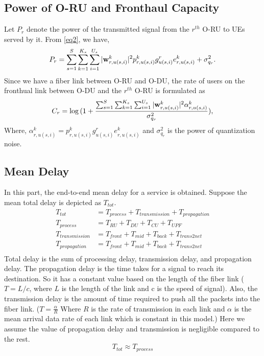 \documentclass[conference]{IEEEtran}
\begin{document}
\subsection{Power of O-RU and Fronthaul Capacity}
Let $P_r$ denote the power of the transmitted signal from the $r^{th}$ O-RU to UEs served by it. From \eqref{eq2}, we have,
\begin{equation}\label{pr}
P_r = \sum_{s=1}^{S}\sum_{k=1}^{K_s}\sum_{i=1}^{U_s}|\bold{w}_{r,u(s,i)}^{k}|^2 p_{r,u(s,i)}^{k} g_{u(s,i)}^r e^k_{r,u(s,i)}+ \sigma_{q_r}^2.
\end{equation}
Since we have a fiber link between O-RU and O-DU, the rate of users on the fronthual link between O-DU and the $r^{th}$ O-RU  is formulated as
\begin{equation}\label{cr}
C_{r} = \log{(1+ \frac{\sum_{s=1}^{S}\sum_{k=1}^{K_s}\sum_{i=1}^{U_s}|\bold{w}_{r,u(s,i)}^{k}|^2 \mathcal{\alpha}^k_{r,u(s,i)} }{ \sigma_{q_{r}}^2})},
\end{equation}
Where, $\mathcal{\alpha}^k_{r,u(s,i)}= p_{r,u(s,i)}^{k} g_{u(s,i)}^r e^k_{r,u(s,i)}$ and $\sigma_{q_{r}}^2$ is the power of quantization noise.
\subsection{Mean Delay}
In this part, the end-to-end mean delay for a service is obtained.
Suppose the mean total delay is depicted as $T_{tot}$.
\begin{equation}
\begin{split}
T_{tot} &=  T_{process} + T_{transmission} + T_{propagation}\\
T_{process} &=  T_{RU} + T_{DU} + T_{CU} + T_{UPF}\\
T_{transmission} &= T_{front} + T_{mid} + T_{back} + T_{trans2net} \\
T_{propagation} &= T_{front} + T_{mid} + T_{back} + T_{trans2net} \\
\end{split}
\end{equation}
Total delay is the sum of processing delay, transmission delay, and propagation delay. 
The propagation delay is the time takes for a signal to reach its destination. So it has a constant value based on the length of the fiber link ($T = L/c$, where $L$ is the length of the link and c is the speed of signal).
Also, the transmission delay is the amount of time required to push all the packets into the fiber link. 
($T = \frac{\alpha}{R}$ Where $R$ is the rate of transmission in each link and $\alpha$ is the mean arrival data rate of each link which is constant in this model.)
Here we assume the value of propagation delay and transmission is negligible compared to the rest.
\begin{equation}
T_{tot} \approx T_{process}
\end{equation}
\end{document}
